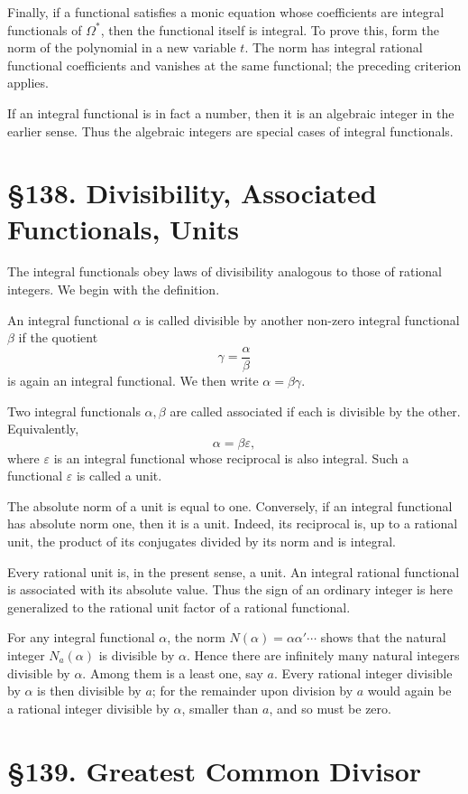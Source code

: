 \documentclass[11pt,a4paper]{book}
\newcommand{\webersection}[2]{\clearpage\section*{\S #1. #2}}
\begin{document}
Finally, if a functional satisfies a monic equation whose coefficients are integral functionals of \(\Omega^*\), then the functional itself is integral.  To prove this, form the norm of the polynomial in a new variable \(t\).  The norm has integral rational functional coefficients and vanishes at the same functional; the preceding criterion applies.

If an integral functional is in fact a number, then it is an algebraic integer in the earlier sense.  Thus the algebraic integers are special cases of integral functionals.

\webersection{138}{Divisibility, Associated Functionals, Units}

The integral functionals obey laws of divisibility analogous to those of rational integers.  We begin with the definition.

An integral functional \(\alpha\) is called divisible by another non-zero integral functional \(\beta\) if the quotient
\[
 \gamma=\frac{\alpha}{\beta}
\]
is again an integral functional.  We then write \(\alpha=\beta\gamma\).

Two integral functionals \(\alpha,\beta\) are called associated if each is divisible by the other.  Equivalently,
\[
 \alpha=\beta\varepsilon,
\]
where \(\varepsilon\) is an integral functional whose reciprocal is also integral.  Such a functional \(\varepsilon\) is called a unit.

The absolute norm of a unit is equal to one.  Conversely, if an integral functional has absolute norm one, then it is a unit.  Indeed, its reciprocal is, up to a rational unit, the product of its conjugates divided by its norm and is integral.

Every rational unit is, in the present sense, a unit.  An integral rational functional is associated with its absolute value.  Thus the sign of an ordinary integer is here generalized to the rational unit factor of a rational functional.

For any integral functional \(\alpha\), the norm \(N(\alpha)=\alpha\alpha'\cdots\) shows that the natural integer \(N_a(\alpha)\) is divisible by \(\alpha\).  Hence there are infinitely many natural integers divisible by \(\alpha\).  Among them is a least one, say \(a\).  Every rational integer divisible by \(\alpha\) is then divisible by \(a\); for the remainder upon division by \(a\) would again be a rational integer divisible by \(\alpha\), smaller than \(a\), and so must be zero.

\webersection{139}{Greatest Common Divisor}
\end{document}
